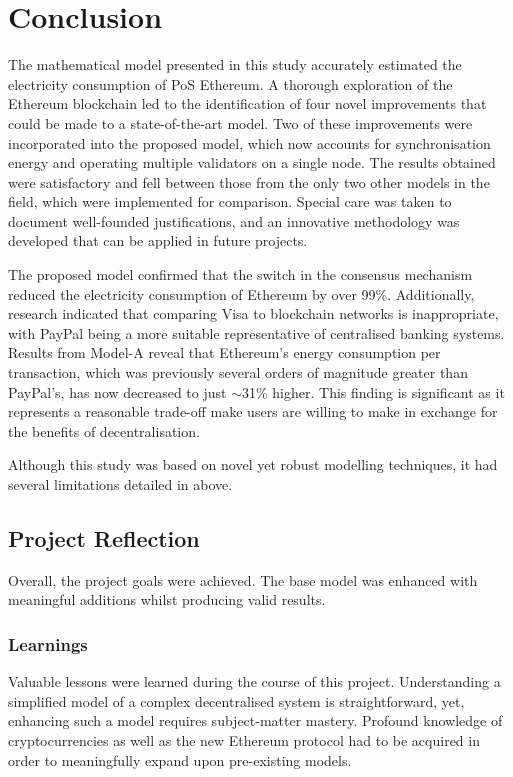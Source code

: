 \chapter{Conclusion}

The mathematical model presented in this study accurately estimated the electricity consumption of PoS Ethereum. A thorough exploration of the Ethereum blockchain led to the identification of four novel improvements that could be made to a state-of-the-art model. Two of these improvements were incorporated into the proposed model, which now accounts for synchronisation energy and operating multiple validators on a single node. The results obtained were satisfactory and fell between those from the only two other models in the field, which were implemented for comparison. Special care was taken to document well-founded justifications, and an innovative methodology was developed that can be applied in future projects. 

The proposed model confirmed that the switch in the consensus mechanism reduced the electricity consumption of Ethereum by over 99\%. Additionally, research indicated that comparing Visa to blockchain networks is inappropriate, with PayPal being a more suitable representative of centralised banking systems. Results from Model-A reveal that Ethereum's energy consumption per transaction, which was previously several orders of magnitude greater than PayPal's, has now decreased to just $\sim$31\% higher. This finding is significant as it represents a reasonable trade-off make users are willing to make in exchange for the benefits of decentralisation.  

Although this study was based on novel yet robust modelling techniques, it had several limitations detailed in  above.


\section{Project Reflection}

Overall, the project goals were achieved. The base model was enhanced with meaningful additions whilst producing valid results.

\subsection{Learnings}

Valuable lessons were learned during the course of this project. Understanding a simplified model of a complex decentralised system is straightforward, yet, enhancing such a  model requires subject-matter mastery. Profound knowledge of cryptocurrencies as well as the new Ethereum protocol had to be acquired in order to meaningfully expand upon pre-existing models.


